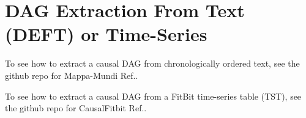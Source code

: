 \chapter{DAG Extraction From Text (DEFT) or Time-Series}
\label{ch-deft}

To see how to extract a causal DAG
from chronologically
ordered text, see the github repo for Mappa-Mundi Ref.\cite{mappa-mundi}.

To see how to extract a causal DAG
from a FitBit time-series table (TST), see the github repo for CausalFitbit Ref.\cite{CausalFitbit}.